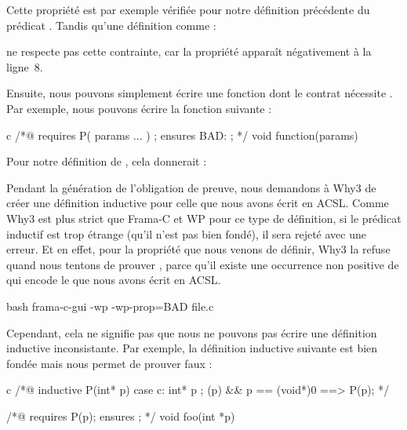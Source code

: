 Cette propriété est par exemple vérifiée pour notre définition précédente du
prédicat . Tandis qu'une définition comme :




ne respecte pas cette contrainte, car la propriété 
apparaît négativement à la ligne~8.


Ensuite, nous pouvons simplement écrire une fonction dont le contrat nécessite
. Par exemple, nous pouvons écrire la fonction suivante :



\begin{CodeBlock}{c}
/*@
  requires P( params ... ) ;
  ensures  BAD: \false ;
*/ void function(params){

}
\end{CodeBlock}


Pour notre définition de , cela donnerait :




Pendant la génération de l'obligation de preuve, nous demandons à Why3 de
créer une définition inductive pour celle que nous avons écrit en ACSL.
Comme Why3 est plus strict que Frama-C et WP pour ce type de définition,
si le prédicat inductif est trop étrange (qu'il n'est pas bien fondé), il
sera rejeté avec une erreur. Et en effet, pour la propriété
 que nous venons de définir, Why3 la refuse quand
nous tentons de prouver , parce
qu'il existe une occurrence non positive de 
qui encode le  que nous avons écrit en ACSL.

\begin{CodeBlock}{bash}
frama-c-gui -wp -wp-prop=BAD file.c
\end{CodeBlock}




Cependant, cela ne signifie pas que nous ne pouvons pas écrire une définition
inductive inconsistante. Par exemple, la définition inductive suivante est bien
fondée mais nous permet de prouver faux :


\begin{CodeBlock}{c}
/*@ inductive P(int* p){
      case c: \forall int* p ; \valid(p) && p == (void*)0 ==> P(p);
    }
*/

/*@ requires P(p);
    ensures \false ; */
void foo(int *p){}
\end{CodeBlock}


